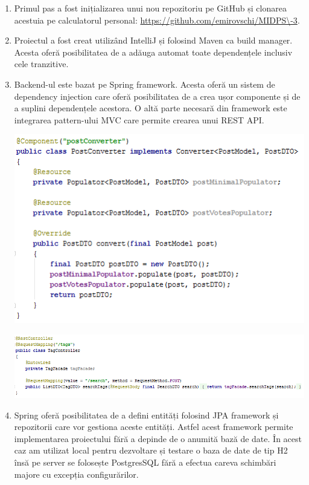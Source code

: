 \begin{enumerate}
\item Primul pas a fost inițializarea unui nou repozitoriu pe GitHub și clonarea acestuia pe calculatorul personal: \url{https://github.com/emirovschi/MIDPS\-3}.
\item Proiectul a fost creat utilizând IntelliJ\cite{IntelliJ} și folosind Maven\cite{Maven} ca build manager. Acesta oferă posibilitatea de a adăuga automat toate dependențele inclusiv cele tranzitive.
\item Backend-ul este bazat pe Spring framework. Acesta oferă un sistem de dependency injection\cite{IoC} care oferă posibilitatea de a crea ușor componente și de a suplini dependențele acestora. O altă parte necesară din framework este integrarea pattern-ului MVC\cite{MVC} care permite  crearea unui REST API.

\begin{minipage}{\linewidth}
	\centering
	\includegraphics{inject}
\end{minipage}
\break

\begin{minipage}{\linewidth}
	\centering
	\includegraphics{rest}
\end{minipage}
\break

\item Spring oferă posibilitatea de a defini entități folosind JPA framework\cite{JPA} și repozitorii care vor gestiona aceste entități. Astfel acest framework permite implementarea proiectului fără a depinde de o anumită bază de date. În acest caz am utilizat local pentru dezvoltare și testare o baza de date de tip H2 însă pe server se folosește PostgresSQL fără a efectua careva schimbări majore cu excepția configurărilor.


\end{enumerate}
